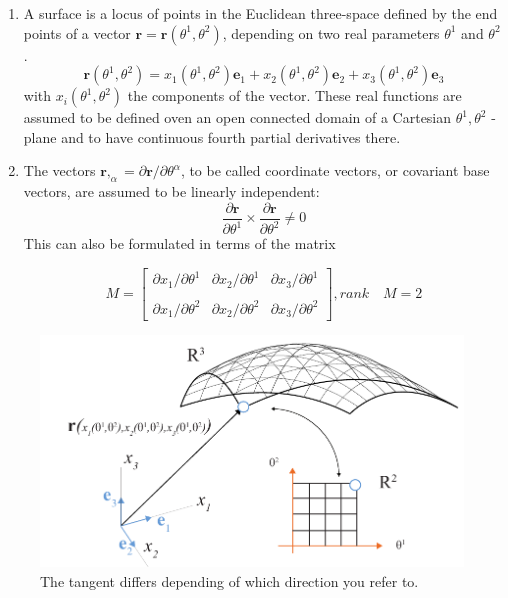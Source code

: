  \renewcommand{\labelenumii}{\Roman{enumii}}
 \begin{enumerate}
 \item A surface is a locus of points in the Euclidean three-space defined by the end points of a vector $\textbf{r} = \textbf{r}(\theta^1 ,\theta^2)$, depending on two real parameters $\theta^1$ and $\theta^2$.
 \begin{equation}
 \textbf{r}(\theta^1,\theta^2) = x_1(\theta^1,\theta^2)\textbf{e}_1 +  x_2(\theta^1,\theta^2)\textbf{e}_2+  x_3(\theta^1,\theta^2)\textbf{e}_3
 \end{equation}
 with $x_i(\theta^1,\theta^2)$ the components of the vector. These real functions are assumed to be defined oven an open connected domain of a Cartesian $\theta^1, \theta^2$ - plane and to have continuous fourth partial derivatives there.
 \item The vectors $\textbf{r},_\alpha = \partial\textbf{r}/\partial \theta^\alpha $, to be called coordinate vectors, or covariant base vectors, are assumed to be linearly independent:
 \begin{equation}
 \frac{\partial\textbf{r}}{\partial \theta^1} \times  \frac{\partial\textbf{r}}{\partial \theta^2} \neq 0
 \end{equation}
 This can also be formulated in terms of the matrix
 

\[M =
\begin{bmatrix}
    \partial x_1/ \partial\theta^1 & \partial x_2/ \partial\theta^1 & \partial x_3/ \partial\theta^1\\
    \\
    \partial x_1/ \partial\theta^2 & \partial x_2/ \partial\theta^2 & \partial x_3/ \partial\theta^2
\end{bmatrix} , rank \quad M = 2
\]
 
 \end{enumerate}




\begin{figure}[H]
\centering
\includegraphics[width=1.0\linewidth]{figure/Theory/SurfDefinition.pdf}
 
\caption{The tangent differs depending of which direction you refer to. }
\end{figure}







